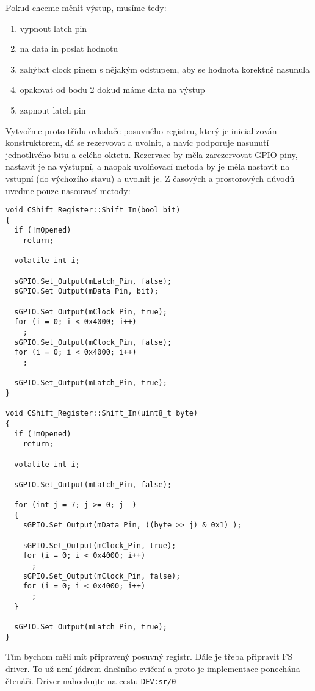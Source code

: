 \documentclass{article}
\begin{document}
Pokud chceme měnit výstup, musíme tedy:
\begin{enumerate}
	\item vypnout latch pin
	\item na data in poslat hodnotu
	\item zahýbat clock pinem s nějakým odstupem, aby se hodnota korektně nasunula
	\item opakovat od bodu 2 dokud máme data na výstup
	\item zapnout latch pin
\end{enumerate}

Vytvořme proto třídu ovladače posuvného registru, který je inicializován konstruktorem, dá se rezervovat a uvolnit, a navíc podporuje nasunutí jednotlivého bitu a celého oktetu. Rezervace by měla zarezervovat GPIO piny, nastavit je na výstupní, a naopak uvolňovací metoda by je měla nastavit na vstupní (do výchozího stavu) a uvolnit je. Z časových a prostorových důvodů uveďme pouze nasouvací metody:
\begin{lstlisting}
void CShift_Register::Shift_In(bool bit)
{
  if (!mOpened)
    return;

  volatile int i;

  sGPIO.Set_Output(mLatch_Pin, false);
  sGPIO.Set_Output(mData_Pin, bit);

  sGPIO.Set_Output(mClock_Pin, true);
  for (i = 0; i < 0x4000; i++)
    ;
  sGPIO.Set_Output(mClock_Pin, false);
  for (i = 0; i < 0x4000; i++)
    ;

  sGPIO.Set_Output(mLatch_Pin, true);
}

void CShift_Register::Shift_In(uint8_t byte)
{
  if (!mOpened)
    return;

  volatile int i;

  sGPIO.Set_Output(mLatch_Pin, false);

  for (int j = 7; j >= 0; j--)
  {
    sGPIO.Set_Output(mData_Pin, ((byte >> j) & 0x1) );

    sGPIO.Set_Output(mClock_Pin, true);
    for (i = 0; i < 0x4000; i++)
      ;
    sGPIO.Set_Output(mClock_Pin, false);
    for (i = 0; i < 0x4000; i++)
      ;
  }

  sGPIO.Set_Output(mLatch_Pin, true);
}
\end{lstlisting}

Tím bychom měli mít připravený posuvný registr. Dále je třeba připravit FS driver. To už není jádrem dnešního cvičení a proto je implementace ponechána čtenáři. Driver nahookujte na cestu \texttt{DEV:sr/0}
\end{document}
